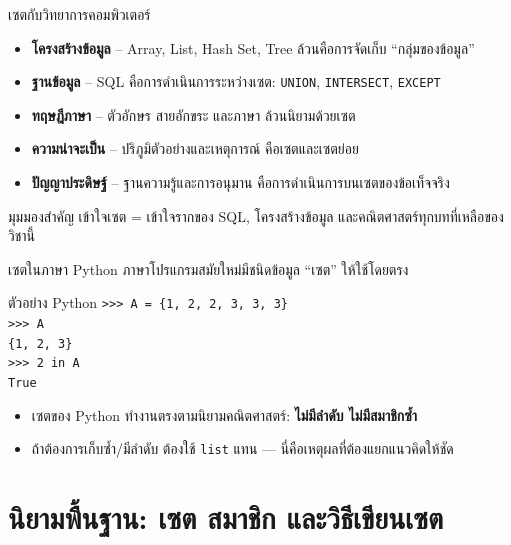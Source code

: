 \begin{frame}{เซตกับวิทยาการคอมพิวเตอร์}
  \begin{itemize}
    \item \textbf{โครงสร้างข้อมูล}  -- Array, List, Hash Set, Tree ล้วนคือการจัดเก็บ ``กลุ่มของข้อมูล''
    \item \textbf{ฐานข้อมูล}  -- SQL คือการดำเนินการระหว่างเซต: \texttt{UNION}, \texttt{INTERSECT}, \texttt{EXCEPT}
    \item \textbf{ทฤษฎีภาษา}  -- ตัวอักษร สายอักขระ และภาษา ล้วนนิยามด้วยเซต
    \item \textbf{ความน่าจะเป็น} -- ปริภูมิตัวอย่างและเหตุการณ์ คือเซตและเซตย่อย
    \item \textbf{ปัญญาประดิษฐ์} -- ฐานความรู้และการอนุมาน คือการดำเนินการบนเซตของข้อเท็จจริง
  \end{itemize}
  \vspace{0.4em}
  \begin{exampleblock}{มุมมองสำคัญ}
    เข้าใจเซต = เข้าใจรากของ SQL, โครงสร้างข้อมูล และคณิตศาสตร์ทุกบทที่เหลือของวิชานี้
  \end{exampleblock}
\end{frame}

\begin{frame}{เซตในภาษา Python}
  ภาษาโปรแกรมสมัยใหม่มีชนิดข้อมูล ``เซต'' ให้ใช้โดยตรง
  \begin{block}{ตัวอย่าง Python}
    \texttt{>>> A = \{1, 2, 2, 3, 3, 3\}} \\
    \texttt{>>> A} \\
    \texttt{\{1, 2, 3\}} \hfill {} \\[0.4em]
    \texttt{>>> 2 in A} \hfill {} \\
    \texttt{True}
  \end{block}
  \vspace{0.4em}
  \begin{itemize}
    \item เซตของ Python ทำงานตรงตามนิยามคณิตศาสตร์: \textbf{ไม่มีลำดับ ไม่มีสมาชิกซ้ำ}
    \item ถ้าต้องการเก็บซ้ำ/มีลำดับ ต้องใช้ \texttt{list} แทน --- นี่คือเหตุผลที่ต้องแยกแนวคิดให้ชัด
  \end{itemize}
\end{frame}


\section{นิยามพื้นฐาน: เซต สมาชิก และวิธีเขียนเซต}

